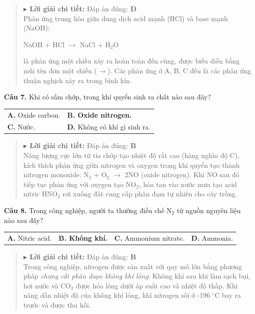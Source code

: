 \documentclass[11pt,a4paper]{article}
\begin{document}
\begin{quote}\small
{\color{myBlue}\textbf{$\blacktriangleright$ Lời giải chi tiết:}} Đáp án đúng: \textbf{\color{red} D}\\
Phản ứng trung hòa giữa dung dịch acid mạnh (HCl) và base mạnh (NaOH):

NaOH + HCl $\longrightarrow$ NaCl + H$_{2}$O

là phản ứng một chiều xảy ra hoàn toàn đến cùng, được biểu diễn bằng mũi tên đơn một chiều ($\longrightarrow$). Các phản ứng ở A, B, C đều là các phản ứng thuận nghịch xảy ra trong bình kín.
\end{quote}
\vspace{2pt}

\textbf{Câu 7.} Khi có sấm chớp, trong khí quyển sinh ra chất nào sau đây?

\begin{tabularx}{\textwidth}{@{}XX@{}}
\textbf{A.} Oxide carbon. & \textbf{\color{red} B. Oxide nitrogen.} \\
\textbf{C.} Nước. & \textbf{D.} Không có khí gì sinh ra. \\
\end{tabularx}

\begin{quote}\small
{\color{myBlue}\textbf{$\blacktriangleright$ Lời giải chi tiết:}} Đáp án đúng: \textbf{\color{red} B}\\
Năng lượng cực lớn từ tia chớp tạo nhiệt độ rất cao (hàng nghìn độ C), kích thích phản ứng giữa nitrogen và oxygen trong khí quyển tạo thành nitrogen monoxide: N$_{2}$ + O$_{2}$ $\longrightarrow$ 2NO (oxide nitrogen). Khí NO sau đó tiếp tục phản ứng với oxygen tạo NO$_{2}$, hòa tan vào nước mưa tạo acid nitric HNO$_{3}$ rơi xuống đất cung cấp phân đạm tự nhiên cho cây trồng.
\end{quote}
\vspace{2pt}

\textbf{Câu 8.} Trong công nghiệp, người ta thường điều chế N$_{2}$ từ nguồn nguyên liệu nào sau đây?

\begin{tabularx}{\textwidth}{@{}XXXX@{}}
\textbf{A.} Nitric acid. & \textbf{\color{red} B. Không khí.} & \textbf{C.} Ammonium nitrate. & \textbf{D.} Ammonia. \\
\end{tabularx}

\begin{quote}\small
{\color{myBlue}\textbf{$\blacktriangleright$ Lời giải chi tiết:}} Đáp án đúng: \textbf{\color{red} B}\\
Trong công nghiệp, nitrogen được sản xuất với quy mô lớn bằng phương pháp \textit{chưng cất phân đoạn không khí lỏng}: Không khí sau khi làm sạch bụi, hơi nước và CO$_{2}$ được hóa lỏng dưới áp suất cao và nhiệt độ thấp. Khi nâng dần nhiệt độ của không khí lỏng, khí nitrogen sôi ở -196 $^\circ\text{C}$ bay ra trước và được thu hồi.
\end{quote}
\vspace{2pt}
\end{document}
